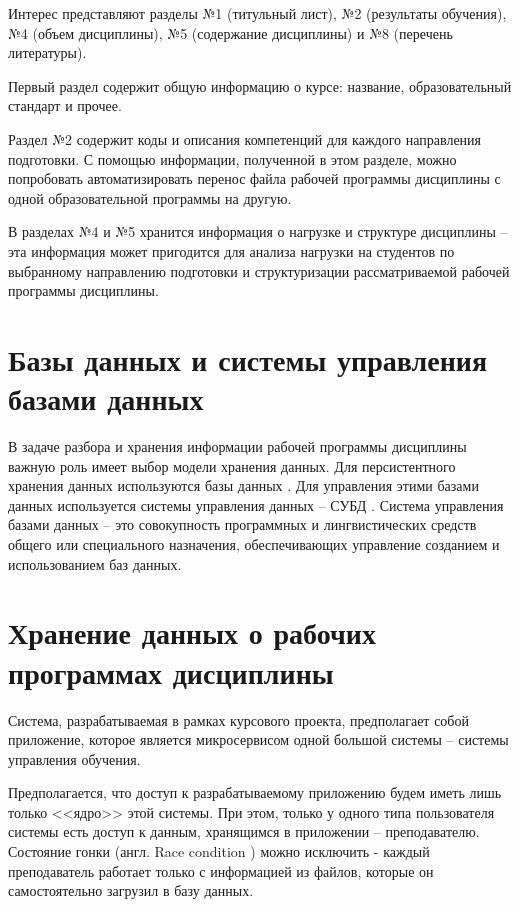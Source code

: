Интерес представляют разделы №1 (титульный лист), №2 (результаты обучения), №4 (объем дисциплины), №5 (содержание дисциплины) и №8 (перечень литературы). 

Первый раздел содержит общую информацию о курсе: название, образовательный стандарт и прочее. 

Раздел №2 содержит коды и описания компетенций для каждого направления подготовки. С помощью информации, полученной в этом разделе, можно попробовать автоматизировать перенос файла рабочей программы дисциплины с одной образовательной программы на другую.

В разделах №4 и №5 хранится информация о нагрузке и структуре дисциплины -- эта информация может пригодится для анализа нагрузки на студентов по выбранному направлению подготовки и структуризации рассматриваемой рабочей программы дисциплины.

\section{Базы данных и системы управления базами данных}

В задаче разбора и хранения информации рабочей программы дисциплины важную роль имеет выбор модели хранения данных. Для персистентного хранения данных используются базы данных \cite{database}. Для управления этими базами данных используется системы управления данных -- СУБД \cite{subd}. Система управления базами данных -- это совокупность программных и лингвистических средств общего или специального назначения, обеспечивающих управление созданием и использованием баз данных.

\section{Хранение данных о рабочих программах дисциплины}

Система, разрабатываемая в рамках курсового проекта, предполагает собой приложение, которое является микросервисом \cite{microservice} одной большой системы -- системы управления обучения. 

Предполагается, что доступ к разрабатываемому приложению будем иметь лишь только <<ядро>> этой системы. При этом, только у одного типа пользователя системы есть доступ к данным, хранящимся в приложении -- преподавателю. Состояние гонки (англ. Race condition \cite{race-condition}) можно исключить - каждый преподаватель работает только с информацией из файлов, которые он самостоятельно загрузил в базу данных.

